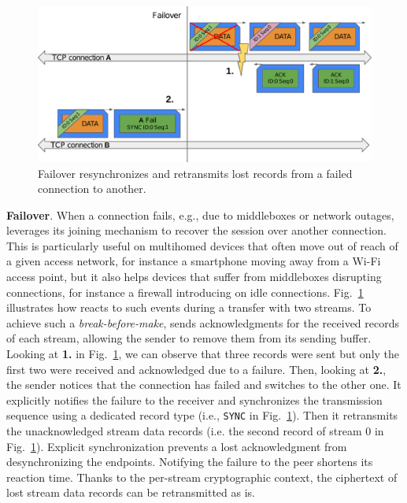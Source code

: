 \begin{figure}[!t]
	\begin{center}
		\includegraphics[width=\columnwidth]{figures/tcpls_failover}
	\end{center}
	\caption{Failover resynchronizes and retransmits lost \tcpls records
	from a failed \tcp connection to another.}
	\label{fig:design-failover}
\end{figure}

\textbf{Failover}.
When a \tcp connection fails, e.g., due to middleboxes or network outages, 
\tcpls leverages its joining mechanism to recover the session over another \tcp 
connection. This is particularly useful on multihomed devices that often move 
out of reach of a given access network, for instance a smartphone moving away 
from a Wi-Fi access point, but it also helps devices that suffer from 
middleboxes disrupting \tcp connections, for instance a firewall introducing 
\tcp \rst on idle \tcp connections. Fig.~\ref{fig:design-failover} illustrates
how \tcpls reacts to such events during a transfer with two \tcpls streams.
To achieve such a \emph{break-before-make},
\tcpls sends acknowledgments for the received records of each stream, allowing
the sender to remove them from its sending buffer.
Looking at \textbf{1.} in Fig.~\ref{fig:design-failover}, we can observe that
three records were sent but only the first two were received and acknowledged
due to a failure. Then, looking at \textbf{2.}, the sender notices that the \tcp connection has failed and switches to the other one. It explicitly notifies the failure to the receiver and synchronizes the transmission sequence using a dedicated \tcpls record type (i.e., \texttt{SYNC} in Fig.~\ref{fig:design-failover}). Then it retransmits the unacknowledged stream data records (i.e. the second record of stream 0 in Fig.~\ref{fig:design-failover}). Explicit synchronization %
prevents a lost acknowledgment from desynchronizing the endpoints. Notifying the failure to the peer shortens its reaction time. Thanks to the per-stream cryptographic context, the ciphertext of lost stream data records can be retransmitted as is.

